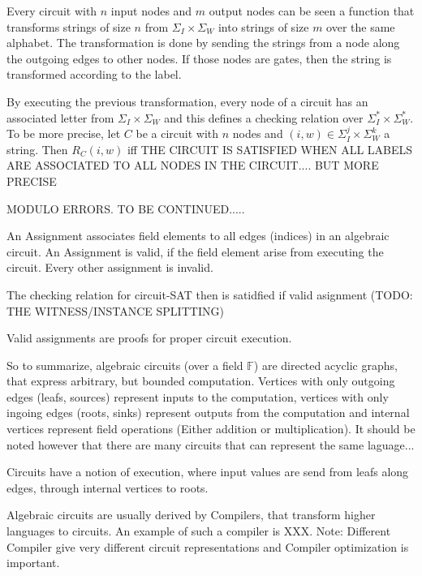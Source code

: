 \begin{remark} Every circuit with $n$ input nodes and $m$ output nodes can be seen a function that transforms strings of size $n$ from $\Sigma_I \times \Sigma_W$ into strings of size $m$ over the same alphabet. The transformation is done by sending the strings from a node along the outgoing edges to other nodes. If those nodes are gates, then the string is transformed according to the label.

By executing the previous transformation, every node of a circuit has an associated letter from $\Sigma_I \times \Sigma_W$ and this defines a checking relation over $\Sigma_I^* \times \Sigma_W^*$. To be more precise, let $C$ be a circuit with $n$ nodes and $(i,w) \in \Sigma_I^j \times \Sigma_W^k$ a string. Then $R_C(i,w)$ iff THE CIRCUIT IS SATISFIED WHEN ALL LABELS ARE ASSOCIATED TO ALL NODES IN THE CIRCUIT.... BUT MORE PRECISE

MODULO ERRORS. TO BE CONTINUED.....

An Assignment associates field elements to all edges (indices) in an algebraic circuit. An Assignment is valid, if the field element arise from executing the circuit. Every other assignment is invalid.

The checking relation for circuit-SAT then is satidfied if valid asignment (TODO: THE WITNESS/INSTANCE SPLITTING)

Valid assignments are proofs for proper circuit execution.
\end{remark}



So to summarize, algebraic circuits (over a field $\mathbb{F}$) are directed acyclic graphs, that express arbitrary, but bounded computation. Vertices with only outgoing edges (leafs, sources) represent inputs to the computation, vertices with only ingoing edges (roots, sinks) represent outputs from the computation and internal vertices represent field operations (Either addition or multiplication). It should be noted however that there are many circuits that can represent the same laguage...

Circuits have a notion of execution, where input values are send from leafs along edges, through internal vertices to roots.

\begin{remark}
Algebraic circuits are usually derived by  Compilers, that transform  higher languages to circuits. An example of such a compiler is XXX. Note: Different Compiler give very different circuit representations and Compiler optimization is important.
\end{remark}


